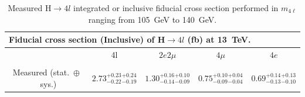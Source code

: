 \begin{table}[!h!tb]
\begin{center}
      \caption{ 
Measured H$\rightarrow 4l$  integrated or inclusive fiducial cross section performed in $m_{4\ell}$ ranging from 105~GeV to 140~GeV.
        } \label{tab:incresultsPAS}
\begin{tabular}{|c|c|c|c|c|}
\hline %
\hline %
	\multicolumn{5}{|l|}{ Fiducial cross section (Inclusive) of  H$\rightarrow 4l$ (fb) at 13~TeV. } \\
\hline %
& 4l & $2e2\mu$ & $4\mu$ & $4e$ \\
\hline %
\vspace{-0.4cm} &&&&\\
Measured (stat.~$\oplus$~sys.)
&$2.73^{+0.23}_{-0.22}{}^{+0.24}_{-0.19}$
&$1.30^{+0.16}_{-0.14}{}^{+0.10}_{-0.09}$
&$0.75^{+0.10}_{-0.09}{}^{+0.04}_{-0.04}$
&$0.69^{+0.14}_{-0.13}{}^{+0.13}_{-0.10}$


\end{tabular}
\end{center}
\end{table}
